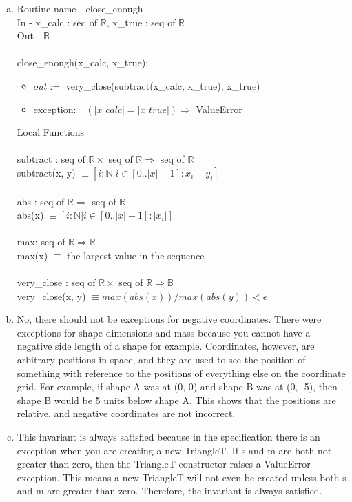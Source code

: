 \documentclass[12pt]{article}
\begin{document}
\begin{enumerate}[a)]
\item Routine name - close\_enough\\
In - x\_calc : seq of $\mathbb{R}$, x\_true : seq of $\mathbb{R}$\\
Out - $\mathbb{B}$\\
\\
close\_enough(x\_calc, x\_true):
\begin{itemize}
	\item $out :=$ very\_close(subtract(x\_calc, x\_true), x\_true)
	\item exception: $\lnot(|x\_calc| = |x\_true|) \Rightarrow$ ValueError
\end{itemize}
Local Functions
\\
\\
subtract : seq of $\mathbb{R} \times$ seq of $\mathbb{R} \Rightarrow$ seq of $\mathbb{R}$\\
subtract(x, y) $\equiv [i : \mathbb{N}|i \in [0..|x|-1] : x_i-y_i]$
\\
\\
abs : seq of $\mathbb{R} \Rightarrow$ seq of $\mathbb{R}$\\
abs(x) $\equiv [i : \mathbb{N}|i \in [0..|x|-1] : |x_i|]$
\\
\\
max: seq of $\mathbb{R} \Rightarrow \mathbb{R}$\\
max(x) $\equiv$ the largest value in the sequence
\\
\\
very\_close : seq of $\mathbb{R} \times$ seq of $\mathbb{R} \Rightarrow \mathbb{B}$\\
very\_close(x, y) $\equiv max(abs(x))/max(abs(y)) < \epsilon$


\item No, there should not be exceptions for negative coordinates. There were exceptions for shape dimensions and mass because you cannot have a negative side length of a shape for example. Coordinates, however, are arbitrary positions in space, and they are used to see the position of something with reference to the positions of everything else on the coordinate grid. For example, if shape A was at (0, 0) and shape B was at (0, -5), then shape B would be 5 units below shape A. This shows that the positions are relative, and negative coordinates are not incorrect.

\item This invariant is always satisfied because in the specification there is an exception when you are creating a new TriangleT. If s and m are both not greater than zero, then the TriangleT constructor raises a ValueError exception. This means a new TriangleT will not even be created unless both s and m are greater than zero. Therefore, the invariant is always satisfied.


\end{enumerate}
\end{document}
